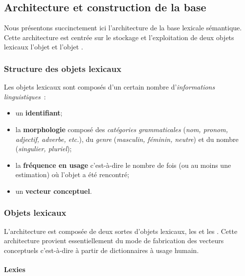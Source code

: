 \subsection{Architecture et construction de la base}

Nous présentons succinctement ici l'architecture de la base lexicale
sémantique. %
Cette architecture est centrée sur le
stockage et l'exploitation de deux objets lexicaux l'objet
 et l'objet .

\subsubsection{Structure des objets lexicaux}

Les objets lexicaux sont composés d'un certain nombre
d'\emph{informations linguistiques}~:

\begin{itemize}
\item un \textbf{identifiant};
\item la \textbf{morphologie} composé des \emph{catégories
    grammaticales} (\emph{nom, pronom, adjectif, adverbe, etc.}), du
  \emph{genre} (\emph{masculin, féminin, neutre}) et du nombre
  (\emph{singulier, pluriel});
\item la \textbf{fréquence en usage} c'est-à-dire le nombre de fois
  (ou au moins une estimation) où l'objet a été rencontré;
\item un \textbf{vecteur conceptuel}.
\end{itemize}

\subsubsection{Objets lexicaux} \label{sec:objets-lexicaux}

L'architecture est composée de deux sortes d'objets lexicaux, les
 et les . Cette architecture
provient essentiellement du mode de fabrication des vecteurs
conceptuels c'est-à-dire à partir de
dictionnaires à usage humain.  \vspace{-0.2cm}
\paragraph{Lexies} \label{sec:lexies}

